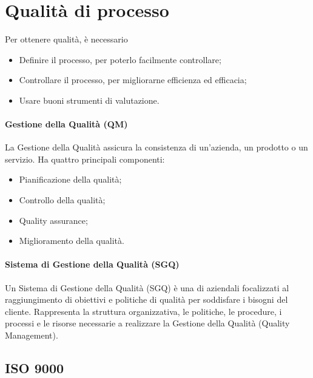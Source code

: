 \section{Qualità di processo}

Per ottenere qualità, è necessario

\begin{itemize}
  \item Definire il processo, per poterlo facilmente controllare;
  \item Controllare il processo, per migliorarne efficienza ed efficacia;
  \item Usare buoni strumenti di valutazione.
\end{itemize}

\paragraph{Gestione della Qualità (QM)}
\label{par:gestione_della_qualit_}

La Gestione della Qualità assicura la consistenza di un'azienda, un prodotto o
un servizio. Ha quattro principali componenti:

\begin{itemize}
  \item Pianificazione della qualità;
  \item Controllo della qualità;
  \item Quality assurance;
  \item Miglioramento della qualità.
\end{itemize}

\paragraph{Sistema di Gestione della Qualità (SGQ)}
\label{par:sistema_di_gestione_della_qualit_}

Un Sistema di Gestione della Qualità (SGQ) è una  di
 aziendali focalizzati al raggiungimento di obiettivi e
politiche di qualità per soddisfare i bisogni del cliente. Rappresenta la
struttura organizzativa, le politiche, le procedure, i processi e le risorse
necessarie a realizzare la Gestione della Qualità (Quality Management).

\subsection{ISO 9000}
\label{sub:iso_9000}

